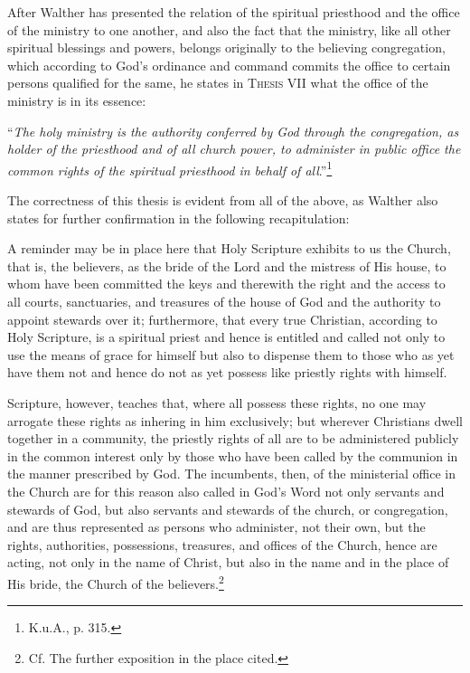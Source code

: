                 After Walther has presented the relation of the spiritual priesthood and the office of the ministry to one another, and also the fact that the ministry, like all other spiritual blessings and powers, belongs originally to the believing congregation, which according to God’s ordinance and command commits the office to certain persons qualified for the same, he states in \textsc{Thesis VII} what the office of the ministry is in its essence: \begin{displayquote}“\textit{The holy ministry is the authority conferred by God through the congregation, as holder of the priesthood and of all church power, to administer in public office the common rights of the spiritual priesthood in behalf of all}.”\footnote{K.u.A., p. 315.}\end{displayquote}  The correctness of this thesis is evident from all of the above, as Walther also states for further confirmation in the following recapitulation: \begin{fancyquotes}A reminder may be in place here that Holy Scripture exhibits to us the Church, that is, the believers, as the bride of the Lord and the mistress of His house, to whom have been committed the keys and therewith the right and the access to all courts, sanctuaries, and treasures of the house of God and the authority to appoint stewards over it; furthermore, that every true Christian, according to Holy Scripture, is a spiritual priest and hence is entitled and called not only to use the means of grace for himself but also to dispense them to those who as yet have them not and hence do not as yet possess like priestly rights with himself. \par Scripture, however, teaches that, where all possess these rights, no one may arrogate these rights as inhering in him exclusively; but wherever Christians dwell together in a community, the priestly rights of all are to be administered publicly in the common interest only by those who have been called by the communion in the manner prescribed by God.  The incumbents, then, of the ministerial office in the Church are for this reason also called in God’s Word not only servants and stewards of God, but also servants and stewards of the church, or congregation, and are thus represented as persons who administer, not their own, but the rights, authorities, possessions, treasures, and offices of the Church, hence are acting, not only in the name of Christ, but also in the name and in the place of His bride, the Church of the believers.\footnote{Cf. The further exposition in the place cited.}\end{fancyquotes}

